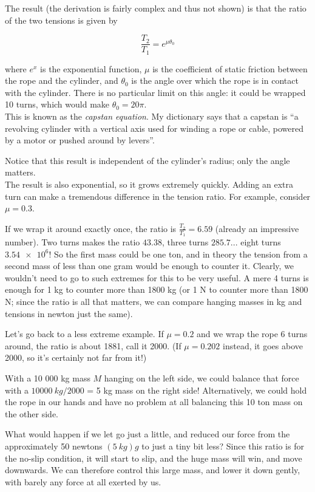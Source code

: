 The result (the derivation is fairly complex and thus not shown) is that the ratio of the two tensions is given by

\begin{equation}
\frac{T_2}{T_1} = e^{\mu \theta_0}
\end{equation}

where $e^x$ is the exponential function, $\mu$ is the coefficient of static friction between the rope and the cylinder, and $\theta_0$ is the angle over which the rope is in contact with the cylinder. There is no particular limit on this angle: it could be wrapped 10 turns, which would make $\theta_0 = 20 \pi$.\\
This is known as the \emph{capstan equation}. My dictionary says that a capstan is ``a revolving cylinder with a vertical axis used for winding a rope or cable, powered by a motor or pushed around by levers''.

Notice that this result is independent of the cylinder's radius; only the angle matters.\\
The result is also exponential, so it grows extremely quickly. Adding an extra turn can make a tremendous difference in the tension ratio. For example, consider $\mu = 0.3$.

If we wrap it around exactly once, the ratio is $\displaystyle \frac{T_2}{T_1} = 6.59$ (already an impressive number). Two turns makes the ratio $43.38$, three turns $285.7$... eight turns $\num{3.54e6}$! So the first mass could be one ton, and in theory the tension from a second mass of less than one gram would be enough to counter it. Clearly, we wouldn't need to go to such extremes for this to be very useful. A mere 4 turns is enough for 1 kg to counter more than 1800 kg (or 1 N to counter more than 1800 N; since the ratio is all that matters, we can compare hanging masses in kg and tensions in newton just the same).

Let's go back to a less extreme example. If $\mu = 0.2$ and we wrap the rope 6 turns around, the ratio is about 1881, call it 2000. (If $\mu = 0.202$ instead, it goes above 2000, so it's certainly not far from it!)

With a 10 000 kg mass $M$ hanging on the left side, we could balance that force with a $\SI{10000}{kg}/2000$ = 5 kg mass on the right side! Alternatively, we could hold the rope in our hands and have no problem at all balancing this 10 ton mass on the other side.

What would happen if we let go just a little, and reduced our force from the approximately 50 newtons $(\SI{5}{kg}) g$ to just a tiny bit less? Since this ratio is for the no-slip condition, it will start to slip, and the huge mass will win, and move downwards. We can therefore control this large mass, and lower it down gently, with barely any force at all exerted by us.

